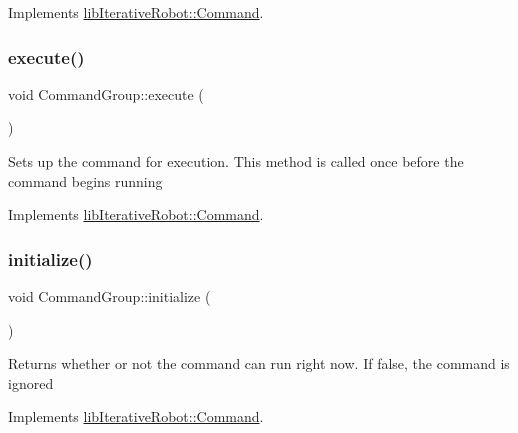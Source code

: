 Implements \mbox{\hyperlink{classlib_iterative_robot_1_1_command_ab30847f09859387b70bb7846f7ce7ca4}{lib\+Iterative\+Robot\+::\+Command}}.

\mbox{\label{classlib_iterative_robot_1_1_command_group_a5e91d370cafde43548d79945ccb4d8fe}} 
\subsubsection{\texorpdfstring{execute()}{execute()}}
{\footnotesize\ttfamily void Command\+Group\+::execute (\begin{DoxyParamCaption}{ }\end{DoxyParamCaption})\hspace{0.3cm}{\ttfamily [virtual]}}

Sets up the command for execution. This method is called once before the command begins running 

Implements \mbox{\hyperlink{classlib_iterative_robot_1_1_command_a4b38164af1a8645fae2fdae296317cf4}{lib\+Iterative\+Robot\+::\+Command}}.

\mbox{\label{classlib_iterative_robot_1_1_command_group_a99800c5dbd05ab750aa0bb27518d0467}} 
\subsubsection{\texorpdfstring{initialize()}{initialize()}}
{\footnotesize\ttfamily void Command\+Group\+::initialize (\begin{DoxyParamCaption}{ }\end{DoxyParamCaption})\hspace{0.3cm}{\ttfamily [virtual]}}

Returns whether or not the command can run right now. If false, the command is ignored 

Implements \mbox{\hyperlink{classlib_iterative_robot_1_1_command_a14543c9d38b07e52f9ffb2af88a63f60}{lib\+Iterative\+Robot\+::\+Command}}.

\mbox{\label{classlib_iterative_robot_1_1_command_group_a5174a8e63675bead12b84e39df0ae90e}} 

